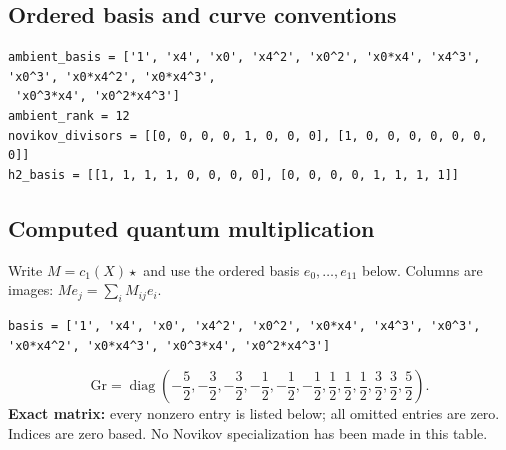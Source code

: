 \documentclass[10pt,a4paper]{article}
\begin{document}
\subsection*{Ordered basis and curve conventions}
\begin{lstlisting}
ambient_basis = ['1', 'x4', 'x0', 'x4^2', 'x0^2', 'x0*x4', 'x4^3', 'x0^3', 'x0*x4^2', 'x0*x4^3',
 'x0^3*x4', 'x0^2*x4^3']
ambient_rank = 12
novikov_divisors = [[0, 0, 0, 0, 1, 0, 0, 0], [1, 0, 0, 0, 0, 0, 0, 0]]
h2_basis = [[1, 1, 1, 1, 0, 0, 0, 0], [0, 0, 0, 0, 1, 1, 1, 1]]
\end{lstlisting}
\subsection*{Computed quantum multiplication}
Write $M=c_1(X)\star$ and use the ordered basis $e_0,\ldots,e_{11}$ below. Columns are images: $M e_j=\sum_i M_{ij}e_i$.
\begin{lstlisting}
basis = ['1', 'x4', 'x0', 'x4^2', 'x0^2', 'x0*x4', 'x4^3', 'x0^3', 'x0*x4^2', 'x0*x4^3', 'x0^3*x4', 'x0^2*x4^3']
\end{lstlisting}
\[\mathrm{Gr}=\operatorname{diag}\!\left(- \frac{5}{2},- \frac{3}{2},- \frac{3}{2},- \frac{1}{2},- \frac{1}{2},- \frac{1}{2},\frac{1}{2},\frac{1}{2},\frac{1}{2},\frac{3}{2},\frac{3}{2},\frac{5}{2}\right).\]
\textbf{Exact matrix:} every nonzero entry is listed below; all omitted entries are zero. Indices are zero based. No Novikov specialization has been made in this table.
\end{document}
